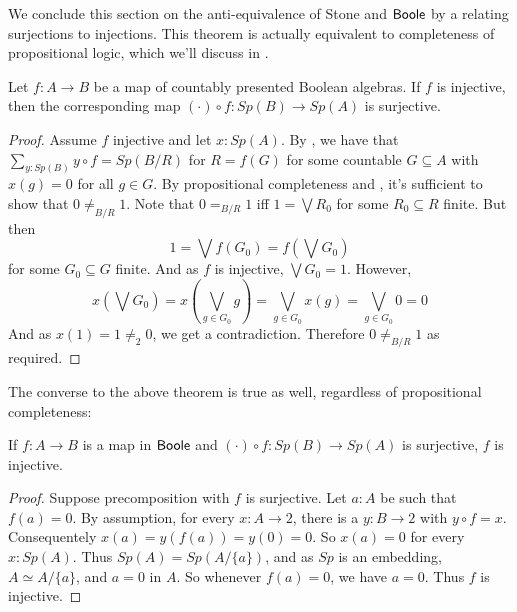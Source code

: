 We conclude this section on the anti-equivalence of Stone and $\mathsf{Boole}$ by a relating surjections to injections. 
This theorem is actually equivalent to completeness of propositional logic, which we'll discuss in 
. 
\begin{theorem}\label{FormalSurjectionsAreSurjections}
  Let $f:A\to B$ be a map of countably presented Boolean algebras. 
  If $f$ is injective, then the corresponding map $(\cdot) \circ f : Sp(B) \to Sp(A)$ is surjective. 
\end{theorem}

\begin{proof}
  Assume $f$ injective and let $x:Sp(A)$.
  By , we have that $\sum\limits_{y:Sp(B)} y\circ f = Sp(B/R) $
  for $R=f(G)$ for some countable $G\subseteq A$ with $x(g) = 0$ for all $g\in G$. 
  By propositional completeness and , 
  it's sufficient to show that $0\neq_{B/R}1$. 
  Note that $0=_{B/R} 1$ iff 
  $1 = \bigvee R_0$ for some $R_0\subseteq R$ finite. 
  But then $$1 = \bigvee f(G_0) = f(\bigvee  G_0)$$ for some $G_0\subseteq G$ finite. 
  And as $f$ is injective, $\bigvee G_0 = 1$. 
  However, 
  $$
  x(\bigvee G_0) = 
  x(\bigvee_{g\in G_0} g ) = \bigvee_{g \in G_0} x(g) = \bigvee_{g\in G_0} 0 = 0$$
  And as $x(1) = 1 \neq_2 0$, we get a contradiction. Therefore $0\neq_{B/R} 1$ as required. 
\end{proof}  
The converse to the above theorem is true as well, regardless of propositional completeness:
\begin{lemma}
If $f:A\to B$ is a map in $\mathsf{Boole}$ and $(\cdot) \circ f :Sp(B) \to Sp(A)$ is surjective, 
$f$ is injective. 
\end{lemma}
\begin{proof}
  Suppose precomposition with $f$ is surjective. 
  Let $a:A$ be such that $f(a)= 0$. 
  By assumption, for every $x:A\to 2$, there is a $y:B\to 2$ with $y\circ f = x$. 
  Consequentely $x(a) = y(f(a)) = y(0) = 0$. 
  So $x(a) = 0$ for every $x:Sp(A)$. 
  Thus $Sp(A) = Sp(A/\{a\})$, and as $Sp$ is an embedding, 
  $A \simeq A/\{a\}$, and $a = 0$ in $A$. 
  So whenever $f(a) = 0$, we have $a=0$. Thus $f$ is injective. 
\end{proof}
